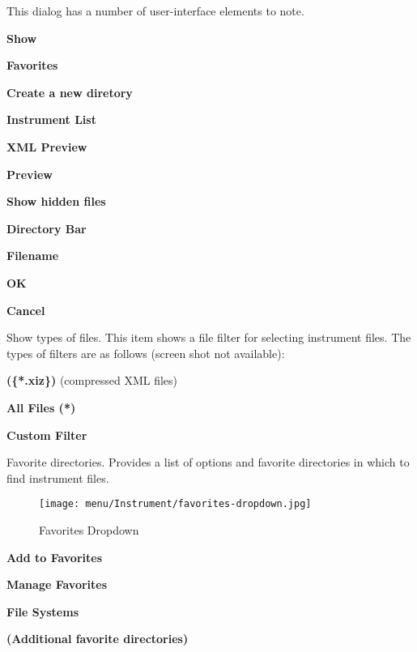 This dialog has a number of user-interface elements to note.

   \begin{enumber}
      \item \textbf{Show}
      \item \textbf{Favorites}
      \item \textbf{Create a new diretory}
      \item \textbf{Instrument List}
      \item \textbf{XML Preview}
      \item \textbf{Preview}
      \item \textbf{Show hidden files}
      \item \textbf{Directory Bar}
      \item \textbf{Filename}
      \item \textbf{OK}
      \item \textbf{Cancel}
   \end{enumber}

   \setcounter{ItemCounter}{0}      %

   Show types of files.
   This item shows a file filter for selecting instrument files.
   The types of filters are as follows (screen shot not available):

   \begin{enumber}
      \item \textbf{(\{*.xiz\})} (compressed XML files)
      \item \textbf{All Files (*)}
      \item \textbf{Custom Filter}
   \end{enumber}

   Favorite directories.
   Provides a list of options and favorite directories in which to find 
   instrument files.

\begin{figure}[H]
   \centering 
   \texttt{[image: menu/Instrument/favorites-dropdown.jpg]}
   \caption{Favorites Dropdown}
   \label{fig:open_instrument_favorites}
\end{figure}

   \begin{enumber}
      \item \textbf{Add to Favorites}
      \item \textbf{Manage Favorites}
      \item \textbf{File Systems}
      \item \textbf{(Additional favorite directories)}
   \end{enumber}

